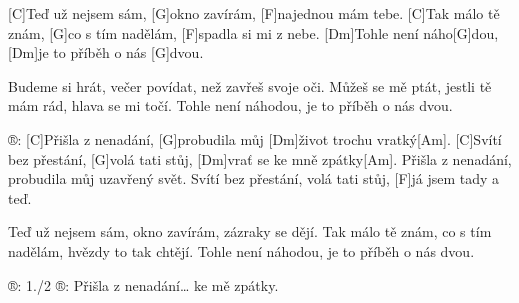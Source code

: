 
[C]Teď už nejsem sám, [G]okno zavírám, [F]najednou mám tebe.
[C]Tak málo tě znám, [G]co s tím nadělám, [F]spadla si mi z nebe.
[Dm]Tohle není náho[G]dou, [Dm]je to příběh o nás [G]dvou.

Budeme si hrát, večer povídat, než zavřeš svoje oči.
Můžeš se mě ptát, jestli tě mám rád, hlava se mi točí.
Tohle není náhodou, je to příběh o nás dvou.

®: [C]Přišla z nenadání, [G]probudila můj [Dm]\null život trochu vratký[Am].
[C]Svítí bez přestání, [G]volá tati stůj, [Dm]vrať se ke mně zpátky[Am].
Přišla z nenadání, probudila můj uzavřený svět.
Svítí bez přestání, volá tati stůj, [F]já jsem tady a teď.

Teď už nejsem sám, okno zavírám, zázraky se dějí.
Tak málo tě znám, co s tím nadělám, hvězdy to tak chtějí.
Tohle není náhodou, je to příběh o nás dvou.

®:
1./2 ®: Přišla z nenadání… ke mě zpátky.